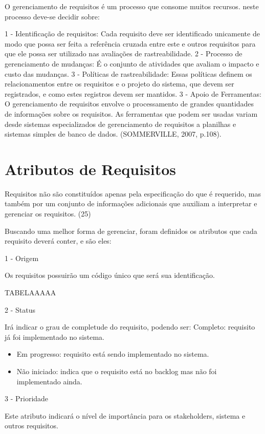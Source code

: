 O gerenciamento de requisitos é um processo que consome muitos recursos. neste processo deve-se decidir sobre:

1 - Identificação de requisitos: Cada requisito deve ser identificado unicamente de modo que possa ser feita a referência cruzada entre este e outros requisitos para que ele possa ser utilizado nas avaliações de rastreabilidade.
2 - Processo de gerenciamento de mudanças: É o conjunto de atividades que avaliam o impacto e custo das mudanças.
3 - Políticas de rastreabilidade: Essas políticas definem os relacionamentos entre os requisitos e o projeto do sistema, que devem ser registrados, e como estes registros devem ser mantidos.
3 - Apoio de Ferramentas: O gerenciamento de requisitos envolve o processamento de grandes quantidades de informações sobre os requisitos. As ferramentas que podem ser usadas variam desde sistemas especializados de gerenciamento de requisitos a planilhas  e sistemas simples de banco de dados.
(SOMMERVILLE, 2007, p.108).

\section{Atributos de Requisitos}

Requisitos não são constituídos apenas pela especificação do que é requerido, mas também por um conjunto de informações adicionais que auxiliam a interpretar e gerenciar os requisitos. (25)

Buscando uma melhor forma de gerenciar, foram definidos os atributos que cada requisito deverá conter, e são eles:

1 - Origem

Os requisitos possuirão um código único que será sua identificação.

TABELAAAAA


2 - Status

Irá indicar o grau de completude do requisito, podendo ser:
Completo: requisito já foi implementado no sistema.

\begin{itemize}
\item Em progresso: requisito está sendo implementado no sistema.
\item Não iniciado: indica que o requisito está no backlog mas não foi implementado ainda.
\end{itemize}

3 - Prioridade

Este atributo indicará o nível de importância para os stakeholders, sistema e outros requisitos.

